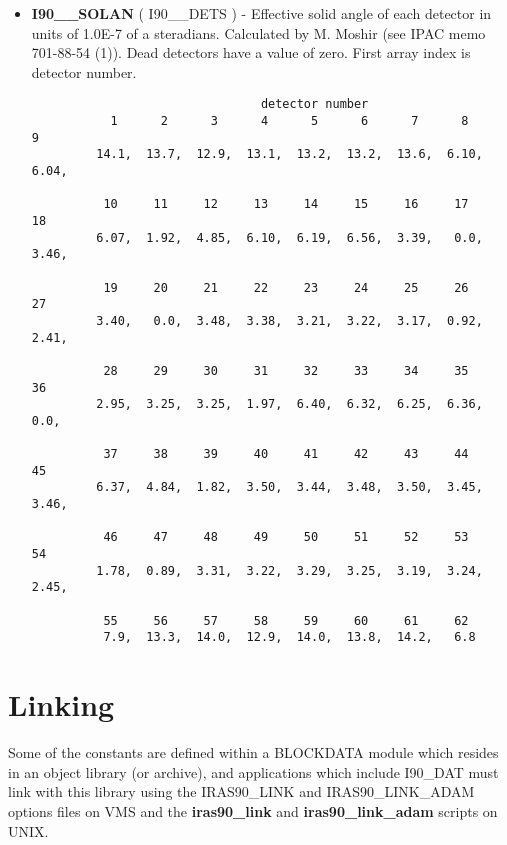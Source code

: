 \begin{itemize}
\item {\bf I90\_\_SOLAN} ( I90\_\_DETS ) -   Effective solid angle of each detector in 
units of 1.0E-7 of a steradians. Calculated by M. Moshir (see IPAC memo
701-88-54 (1)). Dead detectors have a value of zero. First array index is detector number.

\begin{minipage}[t]{\textwidth}
\small
\begin{verbatim}
                                detector number
           1      2      3      4      5      6      7      8      9
         14.1,  13.7,  12.9,  13.1,  13.2,  13.2,  13.6,  6.10,  6.04,  

          10     11     12     13     14     15     16     17     18
         6.07,  1.92,  4.85,  6.10,  6.19,  6.56,  3.39,   0.0,  3.46,  

          19     20     21     22     23     24     25     26     27
         3.40,   0.0,  3.48,  3.38,  3.21,  3.22,  3.17,  0.92,  2.41,  

          28     29     30     31     32     33     34     35     36
         2.95,  3.25,  3.25,  1.97,  6.40,  6.32,  6.25,  6.36,   0.0,  

          37     38     39     40     41     42     43     44     45
         6.37,  4.84,  1.82,  3.50,  3.44,  3.48,  3.50,  3.45,  3.46,  

          46     47     48     49     50     51     52     53     54
         1.78,  0.89,  3.31,  3.22,  3.29,  3.25,  3.19,  3.24,  2.45,

          55     56     57     58     59     60     61     62
          7.9,  13.3,  14.0,  12.9,  14.0,  13.8,  14.2,   6.8

\end{verbatim}
\normalsize
\end{minipage}
\end{itemize}
\section{Linking}

Some of the constants are defined within a BLOCKDATA module which resides in an
object library (or archive), and applications which include I90\_DAT must link
with this library using the IRAS90\_LINK and IRAS90\_LINK\_ADAM options files on 
VMS and the {\bf iras90\_link} and {\bf iras90\_link\_adam} scripts on UNIX.


